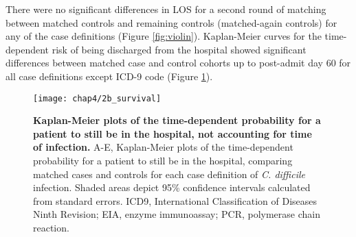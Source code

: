 There were no significant differences in LOS for a second round of matching between matched controls and remaining controls (matched-again controls) for any of the case definitions (Figure \ref{fig:violin}). Kaplan-Meier curves for the time-dependent risk of being discharged from the hospital showed significant differences between matched case and control cohorts up to post-admit day 60 for all case definitions except ICD-9 code (Figure \ref{fig:survival}).

\begin{figure}[htb]
  \texttt{[image: chap4/2b\_survival]}
  \caption[Kaplan-Meier plots for length of stay, not accounting for time of infection]{
    \textbf{Kaplan-Meier plots of the time-dependent probability for a patient to still be in the hospital, not accounting for time of infection.} A-E, Kaplan-Meier plots of the time-dependent probability for a patient to still be in the hospital, comparing matched cases and controls for each case definition of \emph{C. difficile} infection. Shaded areas depict 95\% confidence intervals calculated from standard errors. ICD9, International Classification of Diseases Ninth Revision; EIA, enzyme immunoassay; PCR, polymerase chain reaction.
  }
  \label{fig:survival}
\end{figure}

